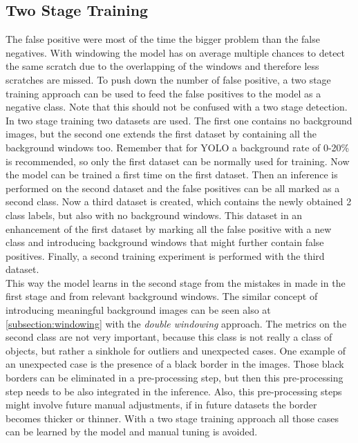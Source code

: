 \subsection{Two Stage Training}
\label{subsection:two_stage_training}
The false positive were most of the time the bigger problem than the false negatives. With windowing the model has on average multiple chances to detect the same scratch due to the overlapping of the windows and therefore less scratches are missed. To push down the number of false positive, a two stage training approach can be used to feed the false positives to the model as a negative class. Note that this should not be confused with a two stage detection. \\
In two stage training two datasets are used. The first one contains no background images, but the second one extends the first dataset by containing all the background windows too. Remember that for YOLO a background rate of 0-20\% is recommended, so only the first dataset can be normally used for training. Now the model can be trained a first time on the first dataset. Then an inference is performed on the second dataset and the false positives can be all marked as a second class. Now a third dataset is created, which contains the newly obtained 2 class labels, but also with no background windows. This dataset in an enhancement of the first dataset by marking all the false positive with a new class and introducing background windows that might further contain false positives. Finally, a second training experiment is performed with the third dataset. \\
This way the model learns in the second stage from the mistakes in made in the first stage and from relevant background windows. The similar concept of introducing meaningful background images can be seen also at \ref{subsection:windowing} with the \textit{double windowing} approach. The metrics on the second class are not very important, because this class is not really a class of objects, but rather a sinkhole for outliers and unexpected cases. One example of an unexpected case is the presence of a black border in the images. Those black borders can be eliminated in a pre-processing step, but then this pre-processing step needs to be also integrated in the inference. Also, this pre-processing steps might involve future manual adjustments, if in future datasets the border becomes thicker or thinner. With a two stage training approach all those cases can be learned by the model and manual tuning is avoided.\\
